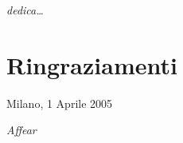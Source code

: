 \thispagestyle{empty}

\begin{flushright}
\Large\textit{dedica\dots}
\end{flushright}


\cleardoublepage

\thispagestyle{empty}

\chapter*{Ringraziamenti}

\begin{flushleft}
Milano, 1 Aprile 2005
\end{flushleft}

\begin{flushright}
\emph{Affear}
\end{flushright}

\cleardoublepage
\thispagestyle{empty}